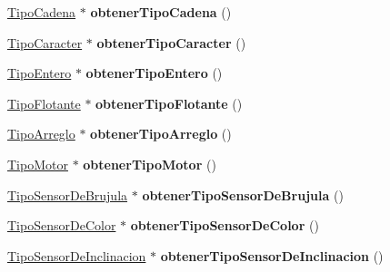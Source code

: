 \begin{DoxyCompactItemize}
\item 
\hypertarget{class_programa_a18ee9edc7aea094f46ab06d21d5165f6}{\hyperlink{class_tipo_cadena}{Tipo\-Cadena} $\ast$ {\bfseries obtener\-Tipo\-Cadena} ()}\label{class_programa_a18ee9edc7aea094f46ab06d21d5165f6}

\item 
\hypertarget{class_programa_acd3b8c83b9ced2b2696ef3ba34b192b0}{\hyperlink{class_tipo_caracter}{Tipo\-Caracter} $\ast$ {\bfseries obtener\-Tipo\-Caracter} ()}\label{class_programa_acd3b8c83b9ced2b2696ef3ba34b192b0}

\item 
\hypertarget{class_programa_a2ca63877d33fc48a57995161267c9851}{\hyperlink{class_tipo_entero}{Tipo\-Entero} $\ast$ {\bfseries obtener\-Tipo\-Entero} ()}\label{class_programa_a2ca63877d33fc48a57995161267c9851}

\item 
\hypertarget{class_programa_a3b90b9472e6d0d9e4d2db36dcfa73bf8}{\hyperlink{class_tipo_flotante}{Tipo\-Flotante} $\ast$ {\bfseries obtener\-Tipo\-Flotante} ()}\label{class_programa_a3b90b9472e6d0d9e4d2db36dcfa73bf8}

\item 
\hypertarget{class_programa_a5fe10e53575d9d5df48b5f149e4f72cf}{\hyperlink{class_tipo_arreglo}{Tipo\-Arreglo} $\ast$ {\bfseries obtener\-Tipo\-Arreglo} ()}\label{class_programa_a5fe10e53575d9d5df48b5f149e4f72cf}

\item 
\hypertarget{class_programa_ab0fd5f510088ab0a0175a87948796c19}{\hyperlink{class_tipo_motor}{Tipo\-Motor} $\ast$ {\bfseries obtener\-Tipo\-Motor} ()}\label{class_programa_ab0fd5f510088ab0a0175a87948796c19}

\item 
\hypertarget{class_programa_ab0ffbd6806b2630b946cc2dc59b72ed9}{\hyperlink{class_tipo_sensor_de_brujula}{Tipo\-Sensor\-De\-Brujula} $\ast$ {\bfseries obtener\-Tipo\-Sensor\-De\-Brujula} ()}\label{class_programa_ab0ffbd6806b2630b946cc2dc59b72ed9}

\item 
\hypertarget{class_programa_a0ab8470463855e82911a0d6a2edb3041}{\hyperlink{class_tipo_sensor_de_color}{Tipo\-Sensor\-De\-Color} $\ast$ {\bfseries obtener\-Tipo\-Sensor\-De\-Color} ()}\label{class_programa_a0ab8470463855e82911a0d6a2edb3041}

\item 
\hypertarget{class_programa_ac1b9a298d26c2bb55f1f0e3b6cb4ac32}{\hyperlink{class_tipo_sensor_de_inclinacion}{Tipo\-Sensor\-De\-Inclinacion} $\ast$ {\bfseries obtener\-Tipo\-Sensor\-De\-Inclinacion} ()}\label{class_programa_ac1b9a298d26c2bb55f1f0e3b6cb4ac32}


\end{DoxyCompactItemize}
